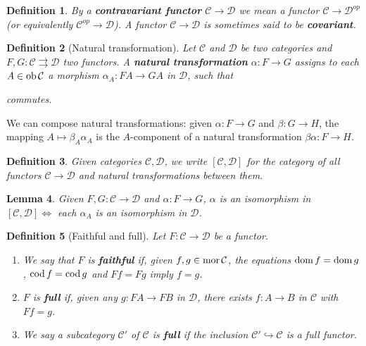 \documentclass[a4paper]{article}
\newtheorem{definition}{Definition}
\newtheorem{lemma}[definition]{Lemma}
\numberwithin{definition}{section}
\newcommand*\dom[1]{\textnormal{dom}\,#1}
\newcommand*\cod[1]{\textnormal{cod}\,#1}
\newcommand*\ob[1]{\textnormal{ob}\,#1}
\newcommand*\mor[1]{\textnormal{mor}\,#1}
\begin{document}
\begin{definition}
	By a \textbf{contravariant functor} $\mathcal{C} \to \mathcal{D}$ we mean a functor $\mathcal{C} \to \mathcal{D}^{op}$ (or equivalently $\mathcal{C}^{op} \to \mathcal{D}$). A functor $\mathcal{C} \to \mathcal{D}$ is sometimes said to be \textbf{covariant}.
\end{definition}

\begin{definition}[Natural transformation]
	Let $\mathcal{C}$ and $\mathcal{D}$ be two categories and $F, G: \mathcal{C} \rightrightarrows \mathcal{D}$ two functors.
	A \textbf{natural transformation} $\alpha:F\to G$ assigns to each $A \in \ob{\mathcal{C}}$ a morphism $\alpha_A:FA\to GA$ in $\mathcal{D}$, such that
	\begin{center}
	\end{center}
	commutes.
\end{definition}

We can compose natural transformations: given $\alpha: F \to G$ and $\beta: G \to H$, the mapping $A \mapsto \beta_A \alpha_A$ is the $A$-component of a natural transformation $\beta\alpha: F \to H$.

\begin{definition}
	Given categories $\mathcal{C}, \mathcal{D}$, we write $[\mathcal{C},\mathcal{D}]$ for the category of all functors $\mathcal{C} \to \mathcal{D}$ and natural transformations between them.
\end{definition}

\begin{lemma}
	Given $F,G: \mathcal{C} \to \mathcal{D}$ and $\alpha: F \to G$, $\alpha$ is an isomorphism in $[\mathcal{C}, \mathcal{D}] \iff$ each $\alpha_A$ is an isomorphism in $\mathcal{D}$.
\end{lemma}

\begin{definition}[Faithful and full]
	Let $F: \mathcal{C} \to \mathcal{D}$ be a functor.
	\begin{enumerate}[label=\alph*.]
		\item We say that $F$ is \textbf{faithful} if, given $f, g \in \mor{\mathcal{C}}$, the equations $\dom{f}=\dom{g}$, $\cod{f}=\cod{g}$ and $Ff = Fg$ imply $f=g$.
		\item $F$ is \textbf{full} if, given any $g: FA \to FB$ in $\mathcal{D}$, there exists $f: A \to B$ in $\mathcal{C}$ with $Ff =g$.
		\item We say a subcategory $\mathcal{C}'$ of $\mathcal{C}$ is \textbf{full} if the inclusion $\mathcal{C}' \hookrightarrow \mathcal{C}$ is a full functor.
	\end{enumerate}
\end{definition}
\end{document}
